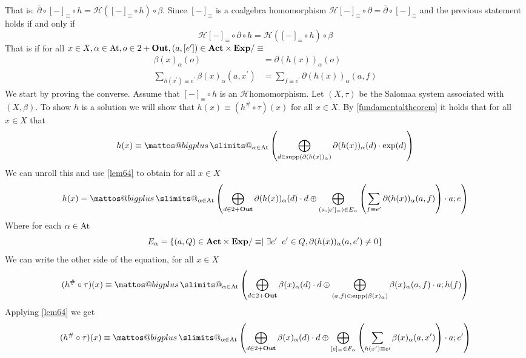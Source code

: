 \documentclass[a4paper,UKenglish,cleveref, autoref, thm-restate]{lipics-v2021}
\makeatletter
\newcommand{\Out}{\textbf{\upshape{Out}}}
\newcommand{\Act}{\textbf{\upshape{Act}}}
\newcommand{\At}{\text{\upshape{At}}}
\newcommand{\Exp}{\textbf{\upshape{Exp}}}
\newcommand{\HCo}{$\mathcal{H}$\text{-coalgebra }}
\theoremstyle{plain}\newtheoremrep{thm}{Theorem}[section]
\newcommand{\bigplus}{\DOTSB\mathop{\mathpalette\mattos@bigplus\relax}\slimits@
}
\newcommand\mattos@bigplus[2]{\vcenter{\hbox{\sbox\z@{$#1\sum$}\resizebox{!}{0.9\dimexpr\ht\z@+\dp\z@}{\raisebox{\depth}{$\m@th#1+$}}}}\vphantom{\sum}}
\makeatother
\begin{document}
\begin{appendixproof}
		That is: $\bar\partial \circ [-]_\equiv \circ h = \mathcal{H}([-]_\equiv\circ h) \circ \beta$. Since $[-]_\equiv$ is a coalgebra homomorphism $\mathcal H[-]_\equiv \circ \partial = \bar\partial \circ [-]_\equiv$ and the previous statement holds if and only if $$\mathcal{H}[-]_\equiv \circ \partial \circ h = \mathcal{H}([-]_\equiv \circ h) \circ \beta$$ That is if for all $x \in X, \alpha \in \At, o \in 2+\Out, (a,[e^\prime]) \in \Act \times \Exp/\equiv$
		\begin{align}
			\beta(x)_\alpha(o) &= \partial(h(x))_\alpha(o) \label{cond1.21}\\
			\sum_{h(x^\prime) \equiv e^\prime}\beta(x)_\alpha(a, x^\prime) &= \sum_{f \equiv e^\prime}\partial(h(x))_\alpha(a,f)\label{cond2.21}
		\end{align}
		We start by proving the converse. Assume that $[-]_\equiv \circ h$ is an \HCo homomorphism. Let $(X, \tau)$ be the Salomaa system associated with $(X, \beta)$. To show $h$ is a solution we will show that $h(x)\equiv (h^{\#} \circ \tau)(x)$ for all $x \in X$. By \cref{fundamentaltheorem} it holds that for all $x \in X$ that
		\begin{align*}
			h(x) \equiv \bigplus_{\alpha\in\At}\left(\bigoplus_{d \in \text{supp}(\partial(h(x))_\alpha)} \partial(h(x))_\alpha(d)\cdot\exp(d)\right)
		\end{align*}
		We can unroll this and use \cref{lem64} to obtain for all $x \in X$
		\begin{align}
			h(x) = \bigplus_{\alpha \in \At}\left(\bigoplus_{d \in 2 + \Out} \partial(h(x))_\alpha(d)\cdot d \oplus \bigoplus_{(a, [e^\prime]_\equiv)\in E_\alpha} \left(\sum_{f \equiv e^\prime} \partial(h(x))_\alpha(a,f)\right)\cdot a;e\right) \label{exp1.21}
		\end{align}
		Where for each $\alpha \in \At$ $$E_\alpha = \{(a, Q) \in \Act \times \Exp/\equiv \mid \exists e^\prime\;\; e^\prime \in Q, \partial(h(x))_\alpha(a, e^\prime) \neq 0\}$$
		We can write the other side of the equation, for all $x \in X$
		$$(h^{\#}\circ \tau)(x) \equiv \bigplus_{\alpha \in \At}\left(\bigoplus_{d \in 2+\Out} \beta(x)_\alpha(d)\cdot d \oplus \bigoplus_{(a,f) \in \text{supp}(\beta(x)_\alpha)} \beta(x)_\alpha(a, f)\cdot a;h(f)\right)$$
		Applying \cref{lem64} we get 
		\begin{align}
			(h^{\#}\circ \tau)(x) \equiv \bigplus_{\alpha \in \At}\left(\bigoplus_{d \in 2+\Out} \beta(x)_\alpha(d)\cdot d \oplus \bigoplus_{[e]_\equiv \in F_\alpha}\left(\sum_{h(x^\prime) \equiv e\prime} \beta(x)_\alpha(a,x^\prime)\right)\cdot a;e^\prime\right) \label{exp2.21} 

\end{align}
\end{appendixproof}
\end{document}
